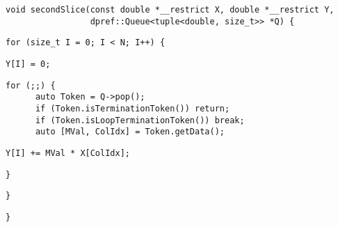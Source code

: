 \begin{lstlisting}[style=cppcode]
void secondSlice(const double *__restrict X, double *__restrict Y,
                 dpref::Queue<tuple<double, size_t>> *Q) {
\end{lstlisting}\vspace{-\baselineskip}

\begin{lstlisting}[style=cppcode, backgroundcolor=\color{yellow!15}, firstnumber=last]
  for (size_t I = 0; I < N; I++) {
\end{lstlisting}\vspace{-\baselineskip}

\begin{lstlisting}[style=cppcode, backgroundcolor=\color{green!15}, firstnumber=last]
    Y[I] = 0;
\end{lstlisting}\vspace{-\baselineskip}

\begin{lstlisting}[style=cppcode, firstnumber=last]
    for (;;) {
      auto Token = Q->pop();
      if (Token.isTerminationToken()) return;
      if (Token.isLoopTerminationToken()) break;
      auto [MVal, ColIdx] = Token.getData();
\end{lstlisting}\vspace{-\baselineskip}

\begin{lstlisting}[style=cppcode, backgroundcolor=\color{green!15}, firstnumber=last]
      Y[I] += MVal * X[ColIdx];
\end{lstlisting}\vspace{-\baselineskip}

\begin{lstlisting}[style=cppcode, firstnumber=last]
    }
\end{lstlisting}\vspace{-\baselineskip}

\begin{lstlisting}[style=cppcode, backgroundcolor=\color{yellow!15}, firstnumber=last]
  }
\end{lstlisting}\vspace{-\baselineskip}

\begin{lstlisting}[style=cppcode, firstnumber=last]
}
\end{lstlisting}\vspace{-\baselineskip}
